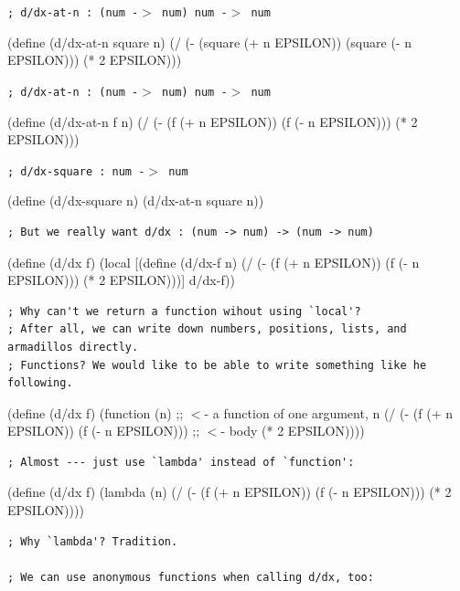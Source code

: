 \documentclass{article}
\begin{document}
{\tt ; d/dx-at-n : (num -$>$ num) num -$>$ num }
\begin{schemedisplay}
(define (d/dx-at-n square n)
  (/ (- (square (+ n EPSILON)) (square (- n EPSILON)))
     (* 2 EPSILON)))
\end{schemedisplay}

{\tt ; d/dx-at-n : (num -$>$ num) num -$>$ num }
\begin{schemedisplay}
(define (d/dx-at-n f n)
  (/ (- (f (+ n EPSILON)) (f (- n EPSILON)))
     (* 2 EPSILON)))
\end{schemedisplay}

{\tt ; d/dx-square : num -$>$ num }
\begin{schemedisplay}
(define (d/dx-square n) (d/dx-at-n square n))
\end{schemedisplay}

\begin{verbatim}
; But we really want d/dx : (num -> num) -> (num -> num)
\end{verbatim}
\begin{schemedisplay}
(define (d/dx f)
  (local [(define (d/dx-f n)
            (/ (- (f (+ n EPSILON)) (f (- n EPSILON)))
               (* 2 EPSILON)))]
      d/dx-f))
\end{schemedisplay}

\begin{verbatim}
; Why can't we return a function wihout using `local'?
; After all, we can write down numbers, positions, lists, and armadillos directly.
; Functions? We would like to be able to write something like he following.
\end{verbatim}

\begin{schemedisplay}
(define (d/dx f)
  (function (n) ;; $<$- a function of one argument, n
     (/ (- (f (+ n EPSILON)) (f (- n EPSILON))) ;; $<$- body
        (* 2 EPSILON))))
\end{schemedisplay}

\newpage

\begin{verbatim}
; Almost --- just use `lambda' instead of `function':
\end{verbatim}

\begin{schemedisplay}
(define (d/dx f)
  (lambda (n)
     (/ (- (f (+ n EPSILON)) (f (- n EPSILON)))
        (* 2 EPSILON))))
\end{schemedisplay}

\begin{verbatim}
; Why `lambda'? Tradition.

; We can use anonymous functions when calling d/dx, too:
\end{verbatim}
\end{document}
